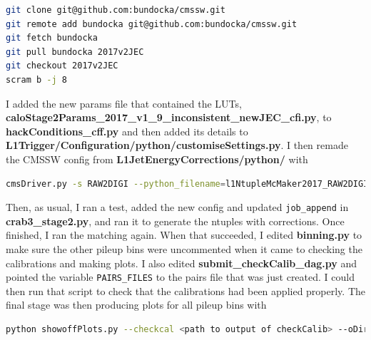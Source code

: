\begin{lstlisting}[belowskip=-0.7cm, language=sh, numbers=none]
git clone git@github.com:bundocka/cmssw.git
git remote add bundocka git@github.com:bundocka/cmssw.git
git fetch bundocka
git pull bundocka 2017v2JEC
git checkout 2017v2JEC
scram b -j 8
\end{lstlisting}

I added the new params file that contained the LUTs, \textbf{caloStage2Params\_2017\_v1\_9\_inconsistent\_newJEC\_cfi.py}, to \textbf{hackConditions\_cff.py} and then added its details to \textbf{L1Trigger/Configuration/python/customiseSettings.py}. I then remade the CMSSW config from \textbf{L1JetEnergyCorrections/python/} with

\begin{lstlisting}[belowskip=-0.7cm, language=sh, numbers=none]
cmsDriver.py -s RAW2DIGI --python_filename=l1NtupleMcMaker2017_RAW2DIGI_v2_closureTest.py -n 100 --no_output --no_exec --era=Run2_2017 --mc --conditions=92X_upgrade2017_TSG_For90XSamples_V1 --customise=L1Trigger/Configuration/customiseReEmul.L1TReEmulMCFrom90xRAWSimHcalTP --customise=L1Trigger/L1TNtuples/customiseL1Ntuple.L1NtupleRAWEMUGEN_MC --customise=L1Trigger/Configuration/customiseSettings.L1TSettingsToCaloStage2Params_2017_v1_9_inconsistent_newJEC --filein=/store/mc/PhaseISpring17DR/QCD_Pt-15to3000_TuneCUETP8M1_Flat_13TeV_pythia8/GEN-SIM-RAW/FlatPU0to70NZS_90X_upgrade2017_realistic_v20-v1/120000/003FF53C-8232-E711-9340-7CD30ACE160C.root
\end{lstlisting}

Then, as usual, I ran a test, added the new config and updated \texttt{job\_append} in \textbf{crab3\_stage2.py}, and ran it to generate the ntuples with corrections. Once finished, I ran the matching again. When that succeeded, I edited \textbf{binning.py} to make sure the other pileup bins were uncommented when it came to checking the calibrations and making plots. I also edited \textbf{submit\_checkCalib\_dag.py} and pointed the variable \texttt{PAIRS\_FILES} to the pairs file that was just created. I could then run that script to check that the calibrations had been applied properly. The final stage was then producing plots for all pileup bins with

\begin{lstlisting}[belowskip=-0.7cm, language=sh, numbers=none]
python showoffPlots.py --checkcal <path to output of checkCalib> --oDir <output directory>
\end{lstlisting}

